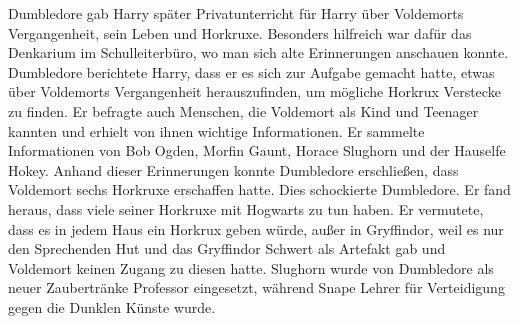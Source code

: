\documentclass[a4paper, 10pt]{article}
\begin{document}
\vspace{10pt}
\newline
{}  
Dumbledore gab Harry später Privatunterricht für Harry über Voldemorts Vergangenheit, sein Leben und Horkruxe. Besonders hilfreich war dafür das Denkarium im Schulleiterbüro, wo man sich alte Erinnerungen anschauen konnte. Dumbledore berichtete Harry, dass er es sich zur Aufgabe gemacht hatte, etwas über Voldemorts Vergangenheit herauszufinden, um mögliche Horkrux Verstecke zu finden. Er befragte auch Menschen, die Voldemort als Kind und Teenager kannten und erhielt von ihnen wichtige Informationen.
\vspace{10pt}
\newline
{}  
Er sammelte Informationen von Bob Ogden, Morfin Gaunt, Horace Slughorn und der Hauselfe Hokey. Anhand dieser Erinnerungen konnte Dumbledore erschließen, dass Voldemort sechs Horkruxe erschaffen hatte. Dies schockierte Dumbledore. Er fand heraus, dass viele seiner Horkruxe mit Hogwarts zu tun haben. Er vermutete, dass es in jedem Haus ein Horkrux geben würde, außer in Gryffindor, weil es nur den Sprechenden Hut und das Gryffindor Schwert als Artefakt gab und Voldemort keinen Zugang zu diesen hatte. Slughorn wurde von Dumbledore als neuer Zaubertränke Professor eingesetzt, während Snape Lehrer für Verteidigung gegen die Dunklen Künste wurde.
\end{document}
